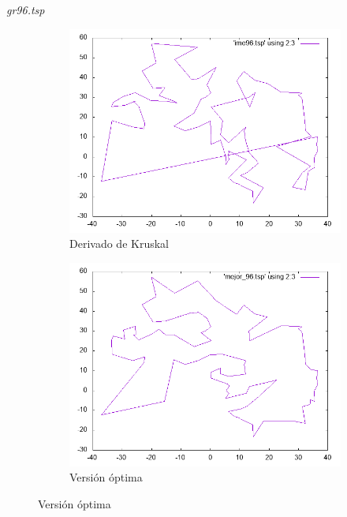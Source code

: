 \documentclass{beamer}
\begin{document}
\begin{frame}[fragile]{\textit{gr96.tsp}}
\begin{figure}[H]
\begin{subfigure}[b]{0.36\textwidth}
\includegraphics[width=\textwidth]{gr96_ime.png}
\caption*{\small{Derivado de Kruskal}}
\end{subfigure}
\quad
\begin{subfigure}[b]{0.36\textwidth}
\includegraphics[width=\textwidth]{gr96_mejor.png}
\caption*{\small{Versión óptima}}
\end{subfigure}
\end{figure}

\end{frame}
\end{document}
